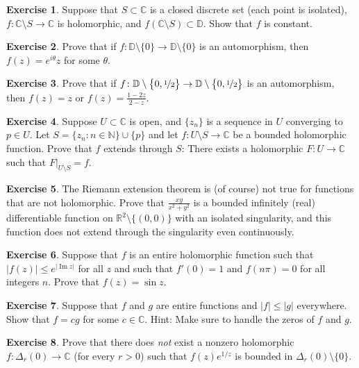 \documentclass[12pt,openany]{book}
\renewcommand{\Im}{\operatorname{Im}}
\newcommand{\sabs}[1]{\lvert {#1} \rvert}
\newcommand{\C}{{\mathbb{C}}}
\newcommand{\R}{{\mathbb{R}}}
\newcommand{\N}{{\mathbb{N}}}
\newcommand{\D}{{\mathbb{D}}}
\theoremstyle{plain}
\theoremstyle{remark}
\theoremstyle{definition}
\newenvironment{exbox}{%
    \def\FrameCommand{\vrule width 1pt \relax\hspace{10pt}}%
    \MakeFramed{\advance\hsize-\width\FrameRestore}%
}{%
    \endMakeFramed
}
\theoremstyle{exercise}
\newtheorem{exercise}{Exercise}[section]
\theoremstyle{example}
\begin{document}
\begin{exbox}
\begin{exercise}
Suppose that $S \subset \C$ is a closed discrete set (each point is isolated),
$f \colon \C \setminus S \to \C$ is holomorphic,
and $f(\C \setminus S) \subset \D$.
Show that $f$ is constant.
\end{exercise}

\begin{exercise}
Prove that if $f \colon \D \setminus \{ 0 \} \to \D \setminus \{ 0 \}$
is an automorphism, then $f(z) = e^{i\theta} z$ for some $\theta$.
\end{exercise}

\begin{exercise}
Prove that if
$f \colon \D \setminus \bigl\{ 0, \nicefrac{1}{2} \bigr\} \to \D \setminus
\bigl\{ 0 , \nicefrac{1}{2} \bigr\}$
is an automorphism, then $f(z) = z$ or $f(z) = \frac{1-2z}{2-z}$.
\end{exercise}

\begin{exercise}
Suppose $U \subset \C$ is open, and
$\{ z_n \}$ is a sequence in $U$ converging to $p \in U$.
Let $S = \{ z_n : n \in \N \} \cup \{ p \}$ and let
$f \colon U \setminus S \to \C$ be a bounded holomorphic function.
Prove that $f$ extends through $S$:  There exists a holomorphic
$F \colon U \to \C$ such that $F|_{U \setminus S} = f$.
\end{exercise}

\begin{exercise}
The Riemann extension theorem is (of course) not true for functions that are
not holomorphic.  Prove that $\frac{xy}{x^2+y^2}$ is a bounded infinitely 
(real) differentiable function
on $\R^2 \setminus \{ (0,0) \}$ with an isolated singularity, and this
function does not
extend through the singularity even continuously.
\end{exercise}

\begin{exercise}
Suppose that $f$ is an entire holomorphic function such that
$\sabs{f(z)} \leq e^{\sabs{\Im z}}$ for all $z$ and such that
$f'(0) =1$ and $f(n\pi) = 0$ for all integers $n$.
Prove that $f(z) = \sin z$.
\end{exercise}

\begin{exercise}
Suppose that $f$ and $g$ are entire functions and $\sabs{f} \leq \sabs{g}$
everywhere.  Show that $f = c g$ for some $c \in \C$.
Hint: Make sure to handle the zeros of $f$ and $g$.
\end{exercise}

\begin{exercise}
Prove that there does \emph{not} exist a nonzero holomorphic
$f \colon \Delta_r(0) \to \C$ (for every $r > 0$)
such that
$f(z) e^{1/z}$ is bounded in $\Delta_r(0) \setminus \{ 0 \}$.
\end{exercise}
\end{exbox}
\end{document}
